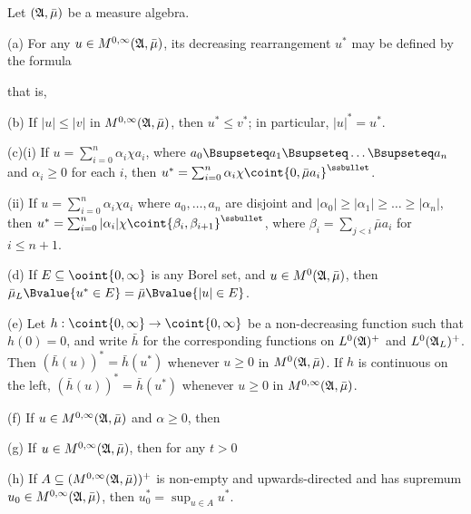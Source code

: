  Let $(\frak A,\bar\mu)$ be a measure algebra.
     
(a) For any $u\in M^{0,\infty}(\frak A,\bar\mu)$, its decreasing
rearrangement $u^*$ may be defined by the formula
     
     
\noindent that is,
     
     
(b) If $|u|\le|v|$ in $M^{0,\infty}(\frak A,\bar\mu)$, then 
$u^*\le v^*$;  in particular, $|u|^*=u^*$.
     
(c)(i) If $u=\sum_{i=0}^n\alpha_i\chi a_i$, where 
$a_0\Bsupseteq a_1\Bsupseteq\ldots\Bsupseteq a_n$ and $\alpha_i\ge 0$ for each $i$,
then $u^*=\sum_{i=0}^n\alpha_i\chi\coint{0,\bar\mu a_i}^{\ssbullet}$.
     
\quad(ii) If $u=\sum_{i=0}^n\alpha_i\chi a_i$ where $a_0,\ldots,a_n$ are
disjoint and $|\alpha_0|\ge|\alpha_1|\ge\ldots\ge|\alpha_n|$, then
$u^*=\sum_{i=0}^n|\alpha_i|\chi\coint{\beta_i,\beta_{i+1}}^{\ssbullet}$,
where $\beta_i=\sum_{j<i}\bar\mu a_i$ for $i\le n+1$.
     
(d) If $E\subseteq\ooint{0,\infty}$ is any Borel set, and 
$u\in M^0(\frak A,\bar\mu)$, then  
$\bar\mu_L\Bvalue{u^*\in E}=\bar\mu\Bvalue{|u|\in E}$.
     
(e) Let $h:\coint{0,\infty}\to\coint{0,\infty}$ be a non-decreasing
function such that $h(0)=0$, and write $\bar h$ for the corresponding
functions on $L^0(\frak A)^+$ and $L^0(\frak A_L)^+$.   Then $(\bar h(u))^*=\bar h(u^*)$ whenever $u\ge 0$ in 
$M^0(\frak A,\bar\mu)$.   If $h$ is
continuous on the left, $(\bar h(u))^*=\bar h(u^*)$ whenever $u\ge 0$ in
$M^{0,\infty}(\frak A,\bar\mu)$.
     
(f) If $u\in M^{0,\infty}(\frak A,\bar\mu)$ and $\alpha\ge 0$, then
     

     
(g) If $u\in M^{0,\infty}(\frak A,\bar\mu)$, then for any $t>0$
     
     
(h) If $A\subseteq (M^{0,\infty}(\frak A,\bar\mu))^+$ is non-empty and
upwards-directed and has supremum 
$u_0\in M^{0,\infty}(\frak A,\bar\mu)$, then
$u_0^*=\sup_{u\in A}u^*$.
     
